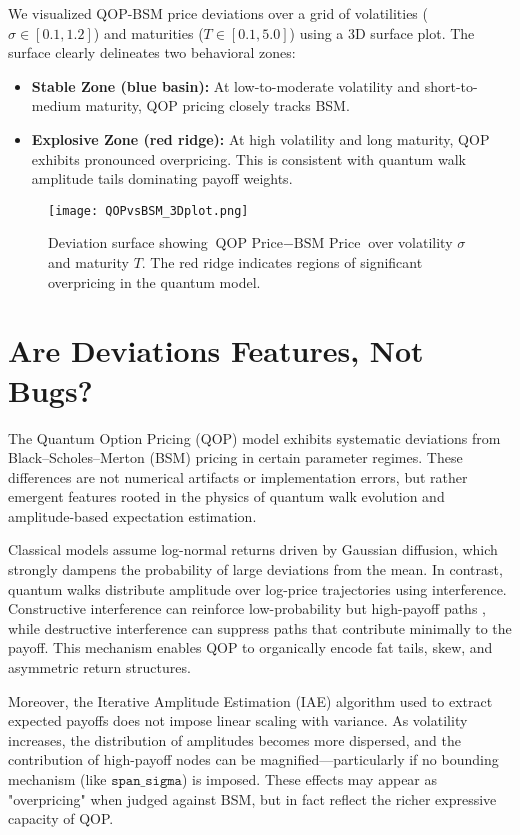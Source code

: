 \documentclass[11pt]{article}
\begin{document}
We visualized QOP-BSM price deviations over a grid of volatilities ($\sigma \in [0.1, 1.2]$) and maturities ($T \in [0.1, 5.0]$) using a 3D surface plot. The surface clearly delineates two behavioral zones:

\begin{itemize}
\item \textbf{Stable Zone (blue basin):} At low-to-moderate volatility and short-to-medium maturity, QOP pricing closely tracks BSM. 
\item \textbf{Explosive Zone (red ridge):} At high volatility and long maturity, QOP exhibits pronounced overpricing. This is consistent with quantum walk amplitude tails dominating payoff weights.
\end{itemize}

\begin{figure}[H]
\centering
\texttt{[image: QOPvsBSM\_3Dplot.png]}
\caption{Deviation surface showing $\text{QOP Price} - \text{BSM Price}$ over volatility $\sigma$ and maturity $T$. The red ridge indicates regions of significant overpricing in the quantum model.}
\label{fig\:qop\_bsm\_surface}
\end{figure}

\section{Are Deviations Features, Not Bugs?}

The Quantum Option Pricing (QOP) model exhibits systematic deviations from Black--Scholes--Merton (BSM) pricing in certain parameter regimes. These differences are not numerical artifacts or implementation errors, but rather emergent features rooted in the physics of quantum walk evolution and amplitude-based expectation estimation.

Classical models assume log-normal returns driven by Gaussian diffusion, which strongly dampens the probability of large deviations from the mean. In contrast, quantum walks distribute amplitude over log-price trajectories using interference. Constructive interference can reinforce low-probability but high-payoff paths \cite{meyer1996quantum}, while destructive interference can suppress paths that contribute minimally to the payoff. This mechanism enables QOP to organically encode fat tails, skew, and asymmetric return structures.

Moreover, the Iterative Amplitude Estimation (IAE) algorithm used to extract expected payoffs does not impose linear scaling with variance. As volatility increases, the distribution of amplitudes becomes more dispersed, and the contribution of high-payoff nodes can be magnified—particularly if no bounding mechanism (like $\texttt{span\_sigma}$) is imposed. These effects may appear as "overpricing" when judged against BSM, but in fact reflect the richer expressive capacity of QOP.
\end{document}
